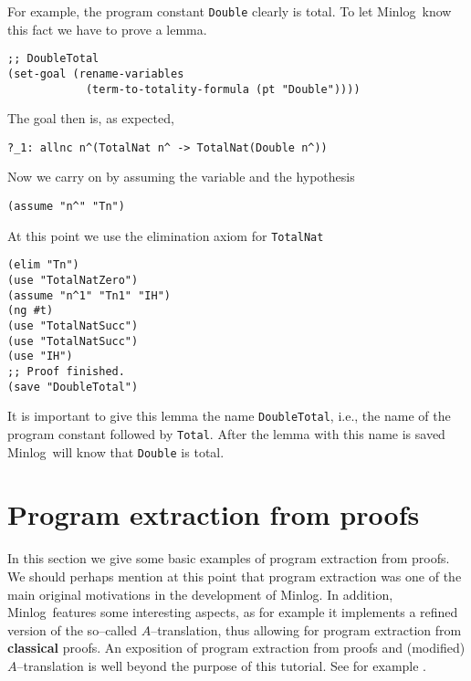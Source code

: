 \documentclass[12pt]{amsart}
\newcommand{\mi}{Minlog}
\begin{document}
For example, the program constant \texttt{Double} clearly is total.
To let \mi\ know this fact we have to prove a lemma.
\begin{verbatim}
;; DoubleTotal
(set-goal (rename-variables
            (term-to-totality-formula (pt "Double"))))
\end{verbatim}
The goal then is, as expected,
\begin{verbatim}
?_1: allnc n^(TotalNat n^ -> TotalNat(Double n^))
\end{verbatim}
Now we carry on by assuming the variable and the hypothesis
\begin{verbatim}
(assume "n^" "Tn")
\end{verbatim}
At this point we use the elimination axiom for \texttt{TotalNat}
\begin{verbatim}
(elim "Tn")
(use "TotalNatZero")
(assume "n^1" "Tn1" "IH")
(ng #t)
(use "TotalNatSucc")
(use "TotalNatSucc")
(use "IH")
;; Proof finished.
(save "DoubleTotal")
\end{verbatim}
It is important to give this lemma the name \texttt{DoubleTotal},
i.e., the name of the program constant followed by \texttt{Total}.
After the lemma with this name is saved \mi\ will know that
\texttt{Double} is total.

\section{Program extraction from proofs}
\label{S:RevI}
In this section we give some basic examples of program extraction from
proofs.  We should perhaps mention at this point that program
extraction was one of the main original motivations in the development
of \mi.  In addition, \mi\ features some interesting aspects, as for
example it implements a refined version of the so--called
$A$--translation, thus allowing for program extraction from
\textbf{classical} proofs.  An exposition of program extraction from
proofs and (modified) $A$--translation is well beyond the purpose of
this tutorial.  See for example \cite{BergerBuchholzSchwichtenberg02,%
  BenlBergerSchwichtenbergSeisenbergerZuber98,%
  SchwichtenbergWainer12}.
\end{document}
